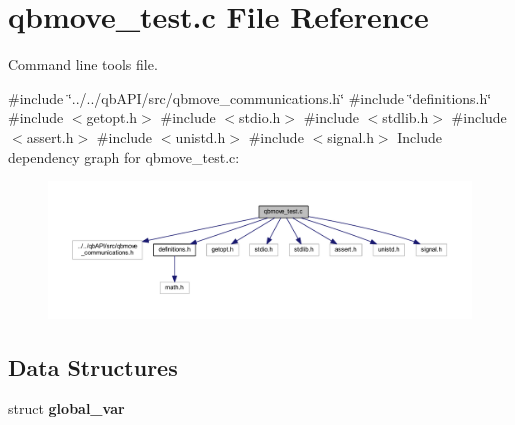 \section{qbmove\+\_\+test.\+c File Reference}
\label{qbmove__test_8c}


Command line tools file.  


{\ttfamily \#include \char`\"{}../../qb\+A\+P\+I/src/qbmove\+\_\+communications.\+h\char`\"{}}\newline
{\ttfamily \#include \char`\"{}definitions.\+h\char`\"{}}\newline
{\ttfamily \#include $<$getopt.\+h$>$}\newline
{\ttfamily \#include $<$stdio.\+h$>$}\newline
{\ttfamily \#include $<$stdlib.\+h$>$}\newline
{\ttfamily \#include $<$assert.\+h$>$}\newline
{\ttfamily \#include $<$unistd.\+h$>$}\newline
{\ttfamily \#include $<$signal.\+h$>$}\newline
Include dependency graph for qbmove\+\_\+test.\+c\+:\nopagebreak
\begin{figure}[H]
\begin{center}
\leavevmode
\includegraphics[width=350pt]{qbmove__test_8c__incl}
\end{center}
\end{figure}
\subsection*{Data Structures}
\begin{DoxyCompactItemize}
\item 
struct \textbf{ global\+\_\+var}
\end{DoxyCompactItemize}
